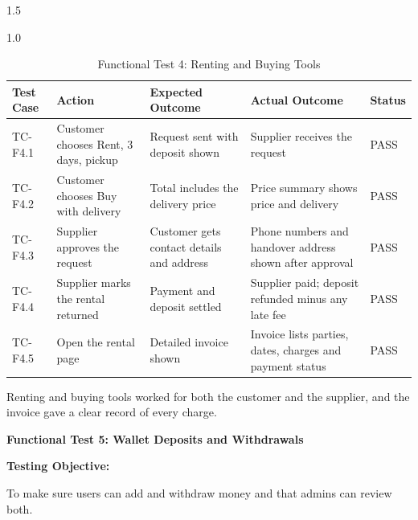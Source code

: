 \documentclass[A4paper,12pt]{report}
\theoremstyle{plain}
\theoremstyle{definition}
\theoremstyle{remark}
\numberwithin{equation}{section}
\begin{document}
\begin{spacing}{1.5}
\begin{table}[H]
\centering
\caption{Functional Test 4: Renting and Buying Tools}
\begin{spacing}{1.0}
{\small
\begin{tabular}{|p{}|p{}|p{}|p{}|p{}|}
\hline
\textbf{Test Case} & \textbf{Action} & \textbf{Expected Outcome} & \textbf{Actual Outcome} & \textbf{Status} \\ \hline
TC-F4.1 & Customer chooses Rent, 3 days, pickup & Request sent with deposit shown & Supplier receives the request & PASS \\ \hline
TC-F4.2 & Customer chooses Buy with delivery & Total includes the delivery price & Price summary shows price and delivery & PASS \\ \hline
TC-F4.3 & Supplier approves the request & Customer gets contact details and address & Phone numbers and handover address shown after approval & PASS \\ \hline
TC-F4.4 & Supplier marks the rental returned & Payment and deposit settled & Supplier paid; deposit refunded minus any late fee & PASS \\ \hline
TC-F4.5 & Open the rental page & Detailed invoice shown & Invoice lists parties, dates, charges and payment status & PASS \\ \hline
\end{tabular}}
\end{spacing}
\end{table}

Renting and buying tools worked for both the customer and the supplier, and the invoice gave a clear record of every charge.

\textbf{Functional Test 5: Wallet Deposits and Withdrawals}

\textbf{Testing Objective:}

To make sure users can add and withdraw money and that admins can review both.


\end{spacing}
\end{document}

